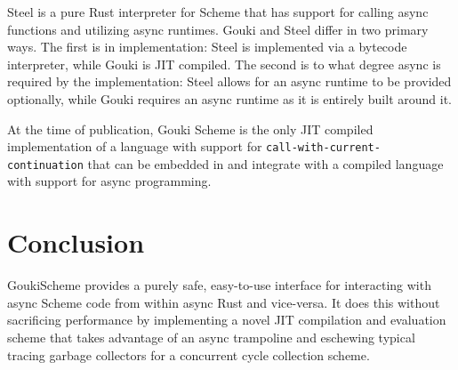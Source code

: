 \documentclass[sigplan,review,anonymous]{acmart}
\begin{document}
Steel\cite{steel} is a pure Rust interpreter for Scheme that has support for
calling async functions and utilizing async runtimes. Gouki and Steel differ in
two primary ways. The first is in implementation: Steel is implemented via a
bytecode interpreter, while Gouki is JIT compiled. The second is to what degree
async is required by the implementation: Steel allows for an async runtime to
be provided optionally, while Gouki requires an async runtime as it is entirely
built around it.

At the time of publication, Gouki Scheme is the only JIT compiled implementation
of a language with support for \texttt{call-with-current-continuation} that can
be embedded in and integrate with a compiled language with support for async
programming.

\section{Conclusion}

GoukiScheme provides a purely safe, easy-to-use interface for interacting with
async Scheme code from within async Rust and vice-versa. It does this without
sacrificing performance by implementing a novel JIT compilation and evaluation
scheme that takes advantage of an async trampoline and eschewing typical tracing
garbage collectors for a concurrent cycle collection scheme. 



\end{document}
